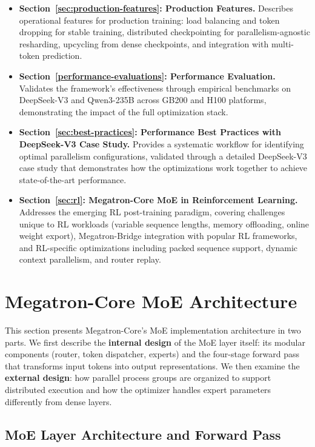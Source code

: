 \documentclass[10pt,logo,copyright]{nvidiatechreport}
\begin{document}
\begin{itemize}
\item \textbf{Section~\ref{sec:production-features}: Production Features.}
Describes operational features for production training: load balancing and token dropping for stable training, distributed checkpointing for parallelism-agnostic resharding, upcycling from dense checkpoints, and integration with multi-token prediction.

\item \textbf{Section~\ref{performance-evaluations}: Performance Evaluation.}
Validates the framework's effectiveness through empirical benchmarks on DeepSeek-V3 and Qwen3-235B across GB200 and H100 platforms, demonstrating the impact of the full optimization stack.

\item \textbf{Section~\ref{sec:best-practices}: Performance Best Practices with DeepSeek-V3 Case Study.}
Provides a systematic workflow for identifying optimal parallelism configurations, validated through a detailed DeepSeek-V3 case study that demonstrates how the optimizations work together to achieve state-of-the-art performance.

\item \textbf{Section~\ref{sec:rl}: Megatron-Core MoE in Reinforcement Learning.}
Addresses the emerging RL post-training paradigm, covering challenges unique to RL workloads (variable sequence lengths, memory offloading, online weight export), Megatron-Bridge integration with popular RL frameworks, and RL-specific optimizations including packed sequence support, dynamic context parallelism, and router replay.

\end{itemize}


\section{Megatron-Core MoE Architecture}\label{meg-core-architecture}

This section presents Megatron-Core's MoE implementation architecture in two parts. We first describe the \textbf{internal design} of the MoE layer itself: its modular components (router, token dispatcher, experts) and the four-stage forward pass that transforms input tokens into output representations. We then examine the \textbf{external design}: how parallel process groups are organized to support distributed execution and how the optimizer handles expert parameters differently from dense layers.

\subsection{MoE Layer Architecture and Forward Pass}\label{sec:moe-layer-architecture}
\end{document}
